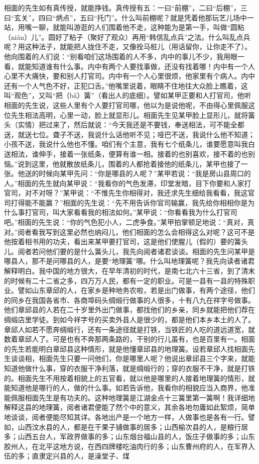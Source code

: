 \documentclass[12pt,UTF8]{ctexbook}
\begin{document}
相面的先生如有真传授，就能挣钱。真传授有五：一曰“前棚”，二曰“后棚”，三曰“玄关”，四曰“炳点”，五曰“托门”。什么叫前棚呢？就是凭着他那玩艺儿场中一站，用嘴一聊，就能叫游逛的人们围着他不走，这种能为是第一手，叫做“圆粘（nián）儿”。圆好了粘子（聚好了观众）再用“韩信乱点兵”之法。什么叫乱点兵呢？用这种法子，就能把人拢住不走，又像拴马桩儿（用话留你，让你走不了）。他向围着的人们说：“别看咱们这场围着的人不多，内中的事儿不少，我用眼一看，就能知道谁有什么事。内中有两个人要找事做，还没有找着哪！内中有一个人心里不大痛快，要和别人打官司。内中有一个人心里很烦，他家里有个病人。内中还有一个人气色不好，正犯口舌。”他嘴里说着，眼睛不住地往大众脸上瞧着，这叫“观色”，又叫“把（bǎ）簧”（看出人的底细）。譬如某甲正要和人打官司，他听相面的先生说，这些人里有个人要打官司哪，他以为是说他呢，不由得心里佩服这位先生相法高明，心里一动，脸上就显形儿。相面先生见某甲脸上显形儿，就将簧头（实情）把过来了，然后就说：“今天我还是不要钱，奉送相法，可不能全都送，就送七位。聋子不送，我说什么话他听不见；哑巴不送，我说什么他不知道；小孩不送，我说什么他也不懂。咱们有个主意，我有七个纸条儿，谁要愿意叫我白送相法，谁伸手，接着一张纸条，便算有谁一相。接着的也别喜欢，接不着的也别恼。”说到这里，他就散放纸条儿，围着的人都抢着接他的纸条儿，某甲也接了一张。他送的时候向某甲先问：“你是哪县的人呢？”某甲若说：“我是房山县周口的人。”相面的先生就向某甲说：“我看你的气色发滞，印堂发暗，目下你要和人家打官司，对不对呀？”某甲说：“不惟先生你相得对，我还求先生细给我看看，我这官司打得能不能赢？”相面的先生说：“先不用告诉你官司输赢，我先给你相相你是为什么事打官司，叫大家看看我的相法如何。”某甲说：“你看看我为什么打官司吧。”相面的先生说：“你的气色犯小人，二虎争食。”某甲拍掌顿足地说：“真对，真对。”阅者看我写到这里必然也纳闷儿，他们相面的怎么会相得这么对呢？这可不是他按着相书用的功夫，看出来某甲要打官司，这是他们使腥儿（假的）要的簧头儿。阅者若问他们要的是什么簧头儿，我先向阅者诸君谈谈。相面的先生问某甲是哪县人，那不是问哪县的人，是要“地理簧”哪。什么叫地理簧呢？我先向读者诸君解释明白。我中国的地方很大，在早年清初的时代，是南七北六十三省，到了清末的时候有二十二省之多，四万万人民，都有一定的职业。可是一县有一县的特殊职业。譬如山东章邱的人，在家乡是种地务农啦，若是出门做事，有两个途径，他们的同乡在我国各省市、各商埠码头绸缎行做事的人很多，十有八九在祥字号做事。他们章邱县的人若在二十岁里外出门做事，都找他们的乡亲，同乡就能把他们荐在绸缎店里学徒。到如今祥字号的买卖外县人是很少的，都是他们本乡本土的人了。章邱人如若不愿奔绸缎行，还有一条途径就是打铁，当铁匠的人吃的道远道宽，就数着章邱人了。可是也有不奔那两条路的，干别的行儿虽有，也是百里有一。相面的先生若能明白章邱县这种情形，就是他懂章邱县的地理簧。设若章邱人找相面先生谈谈相，相面先生只要一问他们，你是哪里人呢？他说出章邱县三个字来，就能知道他做什么事，穿的衣服干净利落，就是绸缎行的；穿的衣服不干净，就是打铁的。相面先生不用按着相貌上的五官看，就以他是哪里的人接着地理簧的情形，就能知道他是哪行的人，做的什么事。如若告诉他，我看你的相貌应当入商界，他准能佩服相面先生是有功夫的。这种地理簧是江湖金点十三簧里第一簧啊！我详细地解释这县的地理簧，阅者诸君便能了然个中的意义，其余各地勿庸如此絮烦，简单地谈谈，阅者便能尽知其详。各地出产是一个地方一样，人做事也是各有一行。譬如，山西汶水县的人，都是在干果子铺做事的居多；山西榆次县的人，是粮行居多；山西五台人，军政界做事的多；山东烟台福山县的人，饭庄子做事的多；山东胶州人，在北平这地方说，在西四牌楼吃油肉行的多；山东曹州府的人，在军界入伍的多；直隶定兴县的人，是澡堂子、煤
\end{document}

